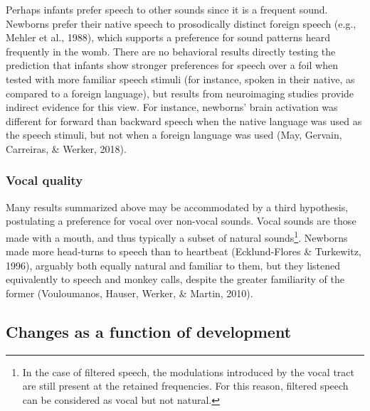 \documentclass[man]{apa6}
\let\rmarkdownfootnote\footnote%
\def\footnote{\protect\rmarkdownfootnote}
\begin{document}
Perhaps infants prefer speech to other sounds since it is a frequent
sound. Newborns prefer their native speech to prosodically distinct
foreign speech (e.g., Mehler et al., 1988), which supports a preference
for sound patterns heard frequently in the womb. There are no behavioral
results directly testing the prediction that infants show stronger
preferences for speech over a foil when tested with more familiar speech
stimuli (for instance, spoken in their native, as compared to a foreign
language), but results from neuroimaging studies provide indirect
evidence for this view. For instance, newborns' brain activation was
different for forward than backward speech when the native language was
used as the speech stimuli, but not when a foreign language was used
(May, Gervain, Carreiras, \& Werker, 2018).

\subsubsection{Vocal quality}\label{vocal-quality}

Many results summarized above may be accommodated by a third hypothesis,
postulating a preference for vocal over non-vocal sounds. Vocal sounds
are those made with a mouth, and thus typically a subset of natural
sounds\footnote{In the case of filtered speech, the modulations
  introduced by the vocal tract are still present at the retained
  frequencies. For this reason, filtered speech can be considered as
  vocal but not natural.}. Newborns made more head-turns to speech than
to heartbeat (Ecklund-Flores \& Turkewitz, 1996), arguably both equally
natural and familiar to them, but they listened equivalently to speech
and monkey calls, despite the greater familiarity of the former
(Vouloumanos, Hauser, Werker, \& Martin, 2010).

\subsection{Changes as a function of
development}\label{changes-as-a-function-of-development}
\end{document}
